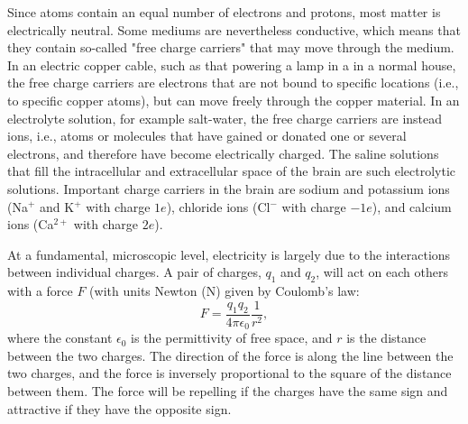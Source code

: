 Since atoms contain an equal number of electrons and protons, most matter is electrically neutral. Some mediums are nevertheless conductive, which means that they contain so-called "free charge carriers" that may move through the medium. In an electric copper cable, such as that powering a lamp in a in a normal house, the free charge carriers are electrons that are not bound to specific locations (i.e., to specific copper atoms), but can move freely through the copper material. In an electrolyte solution, for example salt-water, the free charge carriers are instead ions, i.e., atoms or molecules that have gained or donated one or several electrons, and therefore have become electrically charged. The saline solutions that fill the intracellular and extracellular space of the brain are such electrolytic solutions. Important charge carriers in the brain are sodium and potassium ions (Na$^+$ and K$^+$ with charge $1e$), chloride ions (Cl$^-$ with charge $-1e$), and calcium ions (Ca$^{2+}$ with charge $2e$).

At a fundamental, microscopic level, electricity is largely due to the interactions between individual charges. A pair of charges, $q_1$ and $q_2$, will act on each others with a force $F$ (with units Newton (\si{\newton}) given by Coulomb's law:
\begin{equation}
F = \frac{q_1q_2}{4\pi \epsilon_0} \frac{1}{r^2}, 
\label{eq:Basics:CoulombF}
\end{equation}
where the constant $\epsilon_0$ is the permittivity of free space, and $r$ is the distance between the two charges. The direction of the force is along the line between the two charges, and the force is inversely proportional to the square of the distance between them. The force will be repelling if the charges have the same sign and attractive if they have the opposite sign.

